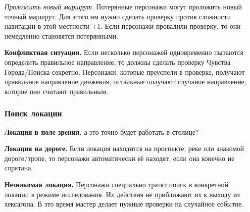 \textit{Проложить новый маршрут.} Потерянные персонажи могут проложить новый точный маршрут.
Для этого им нужно сделать проверку против сложности навигации в этой местности +1. Если
персонажи провалили проверку, то они немедленно становятся потерянными.

\textbf{Конфликтная ситуация.}
Если несколько персонажей одновременно пытаются определить правильное направление, то должны
сделать проверку Чувства Города/Поиска секретно. Персонажи, которые преуспели в проверке, получают правильное
направление движения, остальные получают случаное направление, которое они считают правильным.

\subsubsection*{Поиск локации}
\textbf{Локация в поле зрения.}
а это точно будет работать в столице?

\textbf{Локация на дороге.} Если локация находится на проспекте, реке или знакомой дороге/тропе, то персонажи
автоматически её находят, если она конечно не спрятана.

\textbf{Незнакомая локация.}
Персонажи специально тратят поиск в конкретной локации в режиме исследования.
Их действия не приближают их к выходу из хексагона. В это время мастер делает нужные проверки
на случайное событие.




